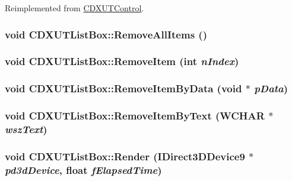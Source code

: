 Reimplemented from \hyperlink{class_c_d_x_u_t_control_a8f1418d201b97e0a9dc83a0e25207eca}{CDXUTControl}.\hypertarget{class_c_d_x_u_t_list_box_ae0391a31359ee6dc8d492da493b1c16d}{
\subsubsection[{RemoveAllItems}]{\setlength{\rightskip}{0pt plus 5cm}void CDXUTListBox::RemoveAllItems ()}}
\label{class_c_d_x_u_t_list_box_ae0391a31359ee6dc8d492da493b1c16d}
\hypertarget{class_c_d_x_u_t_list_box_a711aeffe979787d579b446ef8f1f47da}{
\subsubsection[{RemoveItem}]{\setlength{\rightskip}{0pt plus 5cm}void CDXUTListBox::RemoveItem ({\bf int} {\em nIndex})}}
\label{class_c_d_x_u_t_list_box_a711aeffe979787d579b446ef8f1f47da}
\hypertarget{class_c_d_x_u_t_list_box_af9dc3a6d3863fc60d90ec8f68b687d9f}{
\subsubsection[{RemoveItemByData}]{\setlength{\rightskip}{0pt plus 5cm}void CDXUTListBox::RemoveItemByData (void $\ast$ {\em pData})}}
\label{class_c_d_x_u_t_list_box_af9dc3a6d3863fc60d90ec8f68b687d9f}
\hypertarget{class_c_d_x_u_t_list_box_a2032dd07c99770b04c9d3094d9345055}{
\subsubsection[{RemoveItemByText}]{\setlength{\rightskip}{0pt plus 5cm}void CDXUTListBox::RemoveItemByText (WCHAR $\ast$ {\em wszText})}}
\label{class_c_d_x_u_t_list_box_a2032dd07c99770b04c9d3094d9345055}
\hypertarget{class_c_d_x_u_t_list_box_a7c7284c4fd33fc3d074d3477b3e54d60}{
\subsubsection[{Render}]{\setlength{\rightskip}{0pt plus 5cm}void CDXUTListBox::Render (IDirect3DDevice9 $\ast$ {\em pd3dDevice}, \/  float {\em fElapsedTime})}}
\label{class_c_d_x_u_t_list_box_a7c7284c4fd33fc3d074d3477b3e54d60}


